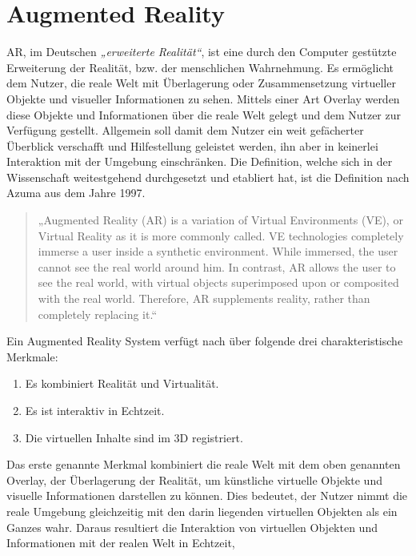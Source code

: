 \section{Augmented Reality}
\label{chap:Augmented Reality}
\acl{AR}, im Deutschen \textit{„erweiterte Realität“}, ist eine durch den Computer gestützte Erweiterung der Realität, bzw. der menschlichen 
Wahrnehmung. Es ermöglicht dem Nutzer, die reale Welt mit Überlagerung oder Zusammensetzung virtueller Objekte und visueller Informationen
zu sehen. Mittels einer Art Overlay werden diese Objekte und Informationen über die reale Welt gelegt und dem Nutzer zur Verfügung gestellt. 
Allgemein soll damit dem Nutzer ein weit gefächerter Überblick verschafft und Hilfestellung geleistet werden, ihn aber in keinerlei 
Interaktion mit der Umgebung einschränken. Die Definition, welche sich in der Wissenschaft weitestgehend durchgesetzt und etabliert hat, ist 
die Definition nach Azuma aus dem Jahre 1997.
\begin{quote}
    „Augmented Reality (AR) is a variation of Virtual Environments (VE), or Virtual Reality as it is more commonly called. VE 
    technologies completely immerse a user inside a synthetic environment. While immersed, the user cannot see the real world around him. 
    In contrast, AR allows the user to see the real world, with virtual objects superimposed upon or composited with the real world. 
    Therefore, AR supplements reality, rather than completely replacing it.“ \cite{azuma.1997a}
\end{quote}
Ein Augmented Reality System verfügt nach \cite{azuma.1997a} über folgende drei charakteristische Merkmale: 
\begin{enumerate}
    \item Es kombiniert Realität und Virtualität. \cite{azuma.1997a}
    \item Es ist interaktiv in Echtzeit. \cite{azuma.1997a}
    \item Die virtuellen Inhalte sind im 3D registriert. \cite{azuma.1997a}
\end{enumerate}
Das erste genannte Merkmal kombiniert die reale Welt mit dem oben genannten Overlay, der Überlagerung der Realität, um künstliche virtuelle 
Objekte und visuelle Informationen darstellen zu können. Dies bedeutet, der Nutzer nimmt die reale Umgebung gleichzeitig mit den darin liegenden virtuellen 
Objekten als ein Ganzes wahr. Daraus resultiert die Interaktion von virtuellen Objekten und Informationen mit der realen Welt in Echtzeit, 
